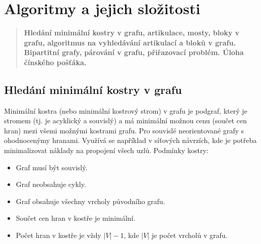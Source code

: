 \section{Algoritmy a jejich složitosti}
\begin{quote}
\textbf{Hledání minimální kostry v grafu, artikulace, mosty, bloky v grafu, algoritmus na vyhledávání artikulací a bloků v grafu. Bipartitní grafy, párování v grafu, přiřazovací problém. Úloha čínského pošťáka.}
\end{quote}

\subsection{Hledání minimální kostry v grafu}
Minimální kostra (nebo minimální kostrový strom) v grafu je podgraf, který je stromem 
(tj. je acyklický a souvislý) a má minimální možnou cenu (součet cen hran) mezi všemi 
možnými kostrami grafu. Pro souvislé neorientované grafy s ohodnocenýmy hranami. Využívá
se například v síťových návrzích, kde je potřeba minimalizovat náklady na propojení 
všech uzlů.
Podmínky kostry:
\begin{itemize}
\item Graf musí být souvislý.
\item Graf neobsahuje cykly.
\item Graf obsahuje všechny vrcholy původního grafu.
\item Součet cen hran v kostře je minimální.
\item Počet hran v kostře je vždy $|V| - 1$, kde $|V|$ je počet vrcholů v grafu.
\end{itemize}

